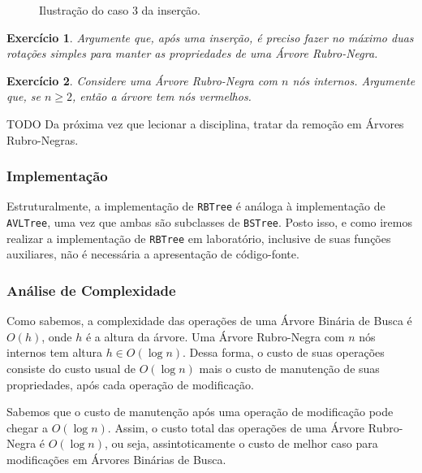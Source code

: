 \documentclass[11pt]{article}
\newtheorem{exercicio}{Exercício}
\begin{document}
\begin{enumerate}
\begin{figure}
{{
    }
  }
  \caption{Ilustração do caso 3 da inserção.}
\label{org52743c4}
\end{figure}

\begin{exercicio}
Argumente que, após uma inserção, é preciso fazer no máximo
duas rotações simples para manter as propriedades de uma Árvore
Rubro-Negra.
\end{exercicio}

\begin{exercicio}
Considere uma Árvore Rubro-Negra com \(n\) nós internos.
Argumente que, se \(n \geq 2\), então a árvore tem nós vermelhos.
\end{exercicio}

TODO Da próxima vez que lecionar a disciplina, tratar da remoção
em Árvores Rubro-Negras.
\end{enumerate}

\subsubsection{Implementação}
\label{sec:org94e6835}

Estruturalmente, a implementação de \texttt{RBTree} é análoga à
implementação de \texttt{AVLTree}, uma vez que ambas são subclasses de
\texttt{BSTree}.  Posto isso, e como iremos realizar a implementação de
\texttt{RBTree} em laboratório, inclusive de suas funções auxiliares, não
é necessária a apresentação de código-fonte.

\subsubsection{Análise de Complexidade}
\label{sec:org952238e}

Como sabemos, a complexidade das operações de uma Árvore Binária
de Busca é \(O(h)\), onde \(h\) é a altura da árvore.  Uma Árvore
Rubro-Negra com \(n\) nós internos tem altura \(h \in O(\log n)\).
Dessa forma, o custo de suas operações consiste do custo usual de
\(O(\log n)\) mais o custo de manutenção de suas propriedades, após
cada operação de modificação.

Sabemos que o custo de manutenção após uma operação de modificação
pode chegar a \(O(\log n)\).  Assim, o custo total das operações de
uma Árvore Rubro-Negra é \(O(\log n)\), ou seja, assintoticamente o
custo de melhor caso para modificações em Árvores Binárias de
Busca.
\end{document}
